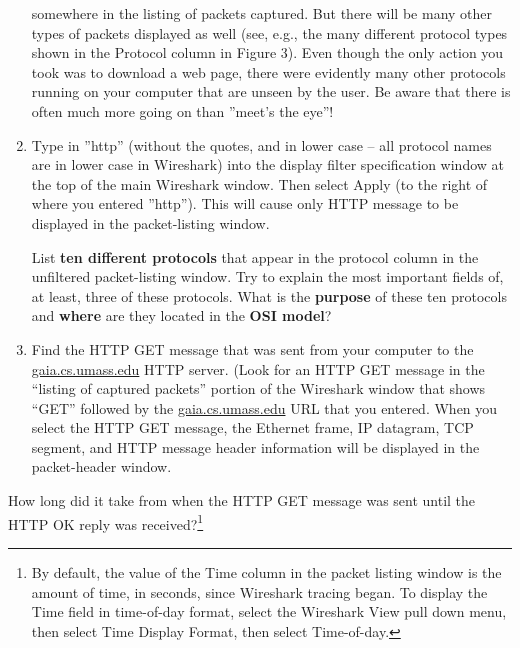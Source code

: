 \documentclass[11pt,a4paper]{article}
\begin{document}
\begin{enumerate}
    somewhere in the listing of packets captured. But there will be many other types
    of packets displayed as well (see, e.g., the many different protocol types shown in
    the Protocol column in Figure 3). Even though the only action you took was to
    download a web page, there were evidently many other protocols running on your
    computer that are unseen by the user. Be aware that there is often much more going on than ''meet’s the eye''!
    \item Type in ''http'' (without the quotes, and in lower case – all protocol names are in
    lower case in Wireshark) into the display filter specification window at the top of
    the main Wireshark window. Then select Apply (to the right of where you entered
    ''http''). This will cause only HTTP message to be displayed in the packet-listing
    window.
    
    \begin{question}
        List \textbf{ten different protocols} that appear in the protocol column in the unfiltered packet-listing window. Try to explain the most important fields of, at least, three of these protocols. What is the \textbf{purpose} of these ten protocols and \textbf{where} are they located in the \textbf{OSI model}?
    \end{question}%
    
    
    
    
    \item Find the HTTP GET message that was sent from your computer to the
    \url{gaia.cs.umass.edu} HTTP server. (Look for an HTTP GET message in the ``listing
    of captured packets'' portion of the Wireshark window  that shows
    ``GET'' followed by the \url{gaia.cs.umass.edu} URL that you entered. When you
    select the HTTP GET message, the Ethernet frame, IP datagram, TCP segment,
    and HTTP message header information will be displayed in the packet-header
    window. 
\end{enumerate}

\begin{question}
    How long did it take from when the HTTP GET message was sent until the HTTP
	OK reply was received?\footnote{By default, the value of the Time column in the packet listing
		window is the amount of time, in seconds, since Wireshark tracing began.
		To display the Time field in time-of-day format, select the Wireshark View pull
		down menu, then select Time Display Format, then select Time-of-day.}
\end{question}
\end{document}
